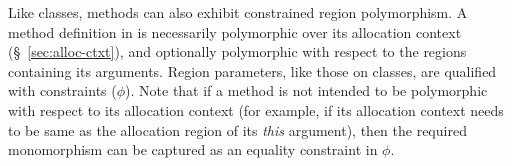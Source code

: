 


Like classes, methods can also exhibit constrained region
polymorphism.  A method definition in \FB is necessarily polymorphic
over its allocation context (\S~\ref{sec:alloc-ctxt}), and
optionally polymorphic with respect to the regions containing its
arguments.  Region parameters, like those on classes, are qualified
with constraints ($\phi$).
Note that if a method is not intended to be polymorphic with respect
to its allocation context (for example, if its allocation context
needs to be same as the allocation region of its \emph{this}
argument), then the required monomorphism can be captured as an
equality constraint in $\phi$.  

